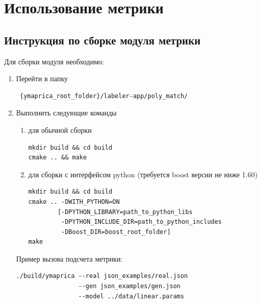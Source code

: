 \documentclass[12pt]{article}
\begin{document}
\section{Использование метрики}
\label{metrica-usage}

\subsection{Инструкция по сборке модуля метрики}
Для сборки модуля необходимо:

\begin{enumerate}
\item Перейти в папку
\begin{verbatim} {ymaprica_root_folder}/labeler-app/poly_match/ \end{verbatim}

\item Выполнить следующие команды
\begin{enumerate}

\item для обычной сборки
\begin{verbatim}
mkdir build && cd build
cmake .. && make
\end{verbatim}

\item для сборки с интерфейсом python (требуется boost версии не ниже 1.60)
\begin{verbatim}
mkdir build && cd build
cmake .. -DWITH_PYTHON=ON
        [-DPYTHON_LIBRARY=path_to_python_libs
         -DPYTHON_INCLUDE_DIR=path_to_python_includes
         -DBoost_DIR=boost_root_folder]
make
\end{verbatim}

\end{enumerate}

Пример вызова подсчета метрики:
\begin{verbatim}
./build/ymaprica --real json_examples/real.json
                 --gen json_examples/gen.json
                 --model ../data/linear.params
\end{verbatim}

\end{enumerate}
\end{document}
